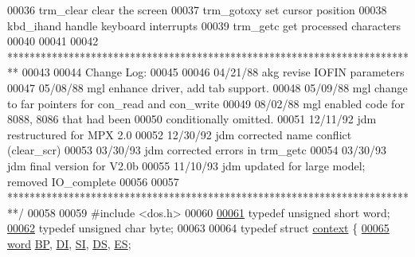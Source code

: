 \begin{DoxyCode}
00036 \textcolor{comment}{                        trm\_clear       clear the screen}
00037 \textcolor{comment}{                        trm\_gotoxy      set cursor position}
00038 \textcolor{comment}{                        kbd\_ihand       handle keyboard interrupts}
00039 \textcolor{comment}{                        trm\_getc        get processed characters}
00040 \textcolor{comment}{}
00041 \textcolor{comment}{}
00042 \textcolor{comment}{**************************************************************************}
00043 \textcolor{comment}{}
00044 \textcolor{comment}{        Change Log:}
00045 \textcolor{comment}{}
00046 \textcolor{comment}{        04/21/88  akg   revise IOFIN parameters}
00047 \textcolor{comment}{        05/08/88  mgl   enhance driver, add tab support.}
00048 \textcolor{comment}{        05/09/88  mgl   change to far pointers for con\_read and con\_write}
00049 \textcolor{comment}{        08/02/88  mgl   enabled code for 8088, 8086 that had been}
00050 \textcolor{comment}{                              conditionally omitted.}
00051 \textcolor{comment}{        12/11/92  jdm   restructured for MPX 2.0}
00052 \textcolor{comment}{        12/30/92  jdm   corrected name conflict (clear\_scr)}
00053 \textcolor{comment}{        03/30/93  jdm   corrected errors in trm\_getc}
00054 \textcolor{comment}{        03/30/93  jdm   final version for V2.0b}
00055 \textcolor{comment}{        11/10/93  jdm   updated for large model; removed IO\_complete}
00056 \textcolor{comment}{}
00057 \textcolor{comment}{**************************************************************************/}
00058 
00059 \textcolor{preprocessor}{#include <dos.h>}
00060 
\hypertarget{trmdrive_8c_source_l00061}{}\hyperlink{trmdrive_8c_a285e72252c100e2508e4e933a0738f2b}{00061} \textcolor{keyword}{typedef} \textcolor{keywordtype}{unsigned} \textcolor{keywordtype}{short} word;
\hypertarget{trmdrive_8c_source_l00062}{}\hyperlink{trmdrive_8c_a0c8186d9b9b7880309c27230bbb5e69d}{00062} \textcolor{keyword}{typedef} \textcolor{keywordtype}{unsigned} \textcolor{keywordtype}{char} byte;
00063 
00064 \textcolor{keyword}{typedef} \textcolor{keyword}{struct }\hyperlink{structcontext}{context} \{
\hypertarget{trmdrive_8c_source_l00065}{}\hyperlink{structcontext_ad8b8154f6a98c5e72b28e6031f135c74}{00065}         \hyperlink{trmdrive_8c_a285e72252c100e2508e4e933a0738f2b}{word} \hyperlink{structcontext_a036a2e025f269d00b084e69796f45680}{BP}, \hyperlink{structcontext_a71fd72ac821b4c932ad6f5befd4a5ea4}{DI}, \hyperlink{structcontext_a6b7fc81c19dfbd3a1438eb7738a712d8}{SI}, \hyperlink{structcontext_a657e73663a4443be61a078d31c28ee3e}{DS}, \hyperlink{structcontext_a81a78fef7bda3a5dd852b28a905890ab}{ES};

\end{DoxyCode}
